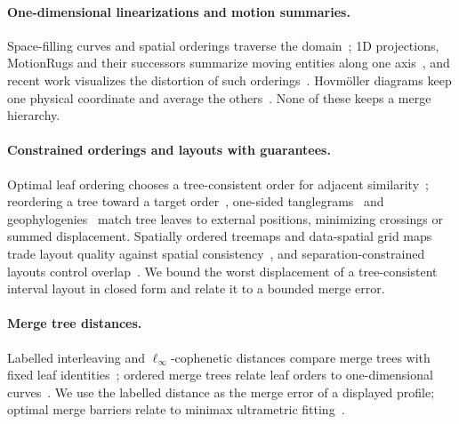 \documentclass[review]{vgtc}
\begin{document}
\paragraph{One-dimensional linearizations and motion summaries.} Space-filling curves and spatial orderings traverse the domain~\cite{Guo:2006:SpatialOrder,Dafner:2000:CSFC,Zhou:2021:DSF}; 1D projections, MotionRugs and their successors summarize moving entities along one axis~\cite{Franke:2021:1DP,Buchmueller:2019:MR,Wulms:2021:SVS,Stolk:2025:GR,Valdrighi:2024:MRV}, and recent work visualizes the distortion of such orderings~\cite{Rauscher:2026:VB,Rauscher:2025:1DO}. Hovm\"oller diagrams keep one physical coordinate and average the others~\cite{Hovmoller:1949}. None of these keeps a merge hierarchy.

\paragraph{Constrained orderings and layouts with guarantees.} Optimal leaf ordering chooses a tree-consistent order for adjacent similarity~\cite{BarJoseph:2001:OLO}; reordering a tree toward a target order~\cite{Bulteau:2022:RT}, one-sided tanglegrams~\cite{Fernau:2010:CTC,Huson:2026:DOT} and geophylogenies~\cite{Klawitter:2025:GP} match tree leaves to external positions, minimizing crossings or summed displacement. Spatially ordered treemaps and data-spatial grid maps trade layout quality against spatial consistency~\cite{Wood:2008:SOT,vanBeusekom:2023:DSL}, and separation-constrained layouts control overlap~\cite{Dwyer:2006:IPSEP,Li:2019:SOI}. We bound the worst displacement of a tree-consistent interval layout in closed form and relate it to a bounded merge error.

\paragraph{Merge tree distances.} Labelled interleaving and $\ell_\infty$-cophenetic distances compare merge trees with fixed leaf identities~\cite{Morozov:2013:IDMT,Munch:2019:LINF,Gasparovic:2024:IID}; ordered merge trees relate leaf orders to one-dimensional curves~\cite{Beurskens:2025:OMT}. We use the labelled distance as the merge error of a displayed profile; optimal merge barriers relate to minimax ultrametric fitting~\cite{Farach:1995:RM}.
\end{document}
